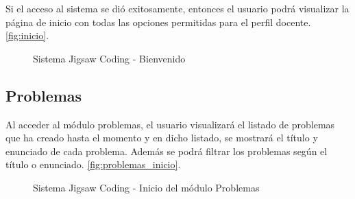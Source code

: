 Si el acceso al sistema se dió exitosamente, entonces el usuario podrá visualizar la página de inicio con todas las opciones permitidas para el perfil docente. \autoref{fig:inicio}.

\begin{figure}[h!]
\centering
\caption[SJC Inicio]{Sistema Jigsaw Coding - Bienvenido}
\label{fig:inicio}
\end{figure}

\subsection{Problemas}
Al acceder al módulo problemas, el usuario visualizará el listado de problemas que ha creado hasta el momento y en dicho listado, se mostrará el título y enunciado de cada problema. Además se podrá filtrar los problemas según el título o enunciado. \autoref{fig:problemas_inicio}.

\begin{figure}[h!]
\centering
\caption[SJC Problemas]{Sistema Jigsaw Coding - Inicio del módulo Problemas}
\label{fig:problemas_inicio}
\end{figure}

